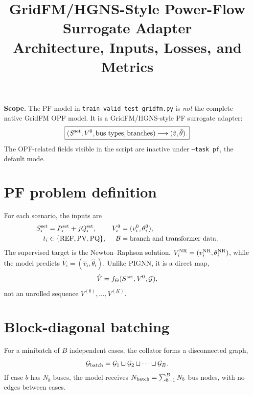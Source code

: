 \documentclass[11pt,a4paper]{article}
\title{GridFM/HGNS-Style Power-Flow Surrogate Adapter\\\large Architecture, Inputs, Losses, and Metrics}
\author{}
\date{}
\begin{document}
\maketitle

\noindent\textbf{Scope.} The PF model in \texttt{train\_valid\_test\_gridfm.py} is \emph{not} the complete native GridFM OPF model. It is a GridFM/HGNS-style PF surrogate adapter:
\[
\boxed{(S^{\rm set},V^0,\text{bus types},\text{branches})\longrightarrow(\hat v,\hat\theta).}
\]
The OPF-related fields visible in the script are inactive under \texttt{--task pf}, the default mode.

\section{PF problem definition}
For each scenario, the inputs are
\begin{align*}
S_i^{\rm set}&=P_i^{\rm set}+jQ_i^{\rm set}, &
V_i^0&=(v_i^0,\theta_i^0),\\
t_i&\in\{\mathrm{REF},\mathrm{PV},\mathrm{PQ}\}, &
\mathcal B&=\text{branch and transformer data}.
\end{align*}
The supervised target is the Newton--Raphson solution, $V_i^{\rm NR}=(v_i^{\rm NR},\theta_i^{\rm NR})$, while the model predicts $\hat V_i=(\hat v_i,\hat\theta_i)$. Unlike PIGNN, it is a direct map,
\[
\hat V=f_\Theta(S^{\rm set},V^0,\mathcal G),
\]
not an unrolled sequence $V^{(0)},\ldots,V^{(K)}$.

\section{Block-diagonal batching}
For a minibatch of $B$ independent cases, the collator forms a disconnected graph,
\[
\mathcal G_{\rm batch}=\mathcal G_1\sqcup\mathcal G_2\sqcup\cdots\sqcup\mathcal G_B.
\]
If case $b$ has $N_b$ buses, the model receives $N_{\rm batch}=\sum_{b=1}^B N_b$ bus nodes, with no edges between cases.
\end{document}
